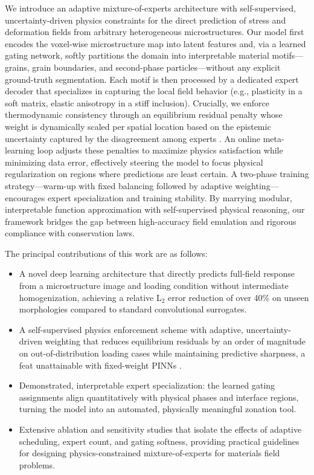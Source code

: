 \documentclass{article}
\begin{document}
We introduce an adaptive mixture-of-experts architecture with self-supervised, uncertainty-driven physics constraints for the direct prediction of stress and deformation fields from arbitrary heterogeneous microstructures. Our model first encodes the voxel-wise microstructure map into latent features and, via a learned gating network, softly partitions the domain into interpretable material motifs—grains, grain boundaries, and second-phase particles—without any explicit ground-truth segmentation. Each motif is then processed by a dedicated expert decoder that specializes in capturing the local field behavior (e.g., plasticity in a soft matrix, elastic anisotropy in a stiff inclusion). Crucially, we enforce thermodynamic consistency through an equilibrium residual penalty whose weight is dynamically scaled per spatial location based on the epistemic uncertainty captured by the disagreement among experts \cite{kendall2018multi,gal2016dropout}. An online meta-learning loop \cite{wang2021and} adjusts these penalties to maximize physics satisfaction while minimizing data error, effectively steering the model to focus physical regularization on regions where predictions are least certain. A two-phase training strategy—warm-up with fixed balancing followed by adaptive weighting—encourages expert specialization and training stability. By marrying modular, interpretable function approximation with self-supervised physical reasoning, our framework bridges the gap between high-accuracy field emulation and rigorous compliance with conservation laws.

The principal contributions of this work are as follows:
\begin{itemize}
    \item A novel deep learning architecture that directly predicts full-field response from a microstructure image and loading condition without intermediate homogenization, achieving a relative L$_2$ error reduction of over 40\% on unseen morphologies compared to standard convolutional surrogates.
    \item A self-supervised physics enforcement scheme with adaptive, uncertainty-driven weighting that reduces equilibrium residuals by an order of magnitude on out-of-distribution loading cases while maintaining predictive sharpness, a feat unattainable with fixed-weight PINNs \cite{henkes2020physics}.
    \item Demonstrated, interpretable expert specialization: the learned gating assignments align quantitatively with physical phases and interface regions, turning the model into an automated, physically meaningful zonation tool.
    \item Extensive ablation and sensitivity studies that isolate the effects of adaptive scheduling, expert count, and gating softness, providing practical guidelines for designing physics-constrained mixture-of-experts for materials field problems.
\end{itemize}
\end{document}
